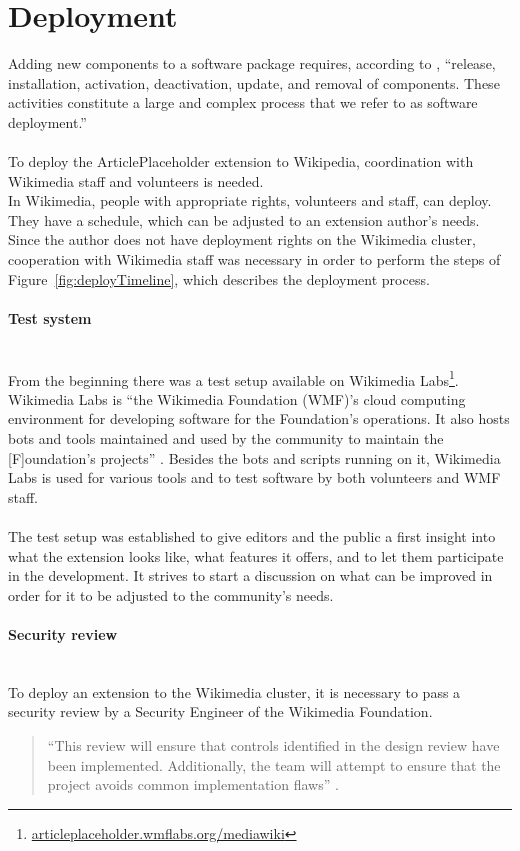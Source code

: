 \section{Deployment}

Adding new components to a software package requires, according to \citet{deployment}, ``release, installation, activation, deactivation, update, and removal of components. These activities constitute a large and complex process that we refer to as software deployment.'' \\
\\
To deploy the ArticlePlaceholder extension to Wikipedia, coordination with Wikimedia staff and volunteers is needed. \\
In Wikimedia, people with appropriate rights, volunteers and staff, can deploy. They have a schedule, which can be adjusted to an extension author's needs. Since the author does not have deployment rights on the Wikimedia cluster, cooperation with Wikimedia staff was necessary in order to perform the steps of Figure~\ref{fig:deployTimeline}, which describes the deployment process. \\



\paragraph{Test system} ~\\
From the beginning there was a test setup available on Wikimedia Labs\footnote{\url{articleplaceholder.wmflabs.org/mediawiki}}. Wikimedia Labs is ``the Wikimedia Foundation (WMF)'s cloud computing environment for developing software for the Foundation's operations. It also hosts bots and tools maintained and used by the community to maintain the [F]oundation's projects'' \citep{wiki:03}.
Besides the bots and scripts running on it, Wikimedia Labs is used for various tools and to test software by both volunteers and WMF staff. \\
\\
The test setup was established to give editors and the public a first insight into what the extension looks like, what features it offers, and to let them participate in the development. It strives to start a discussion on what can be improved in order for it to be adjusted to the community's needs.

\paragraph{Security review} ~\\
To deploy an extension to the Wikimedia cluster, it is necessary to pass a security review by a Security Engineer of the Wikimedia Foundation. 
\begin{quote}
``This review will ensure that controls identified in the design review have been implemented. Additionally, the team will attempt to ensure that the project avoids common implementation flaws'' \citep{wiki:38}.
\end{quote}
  
